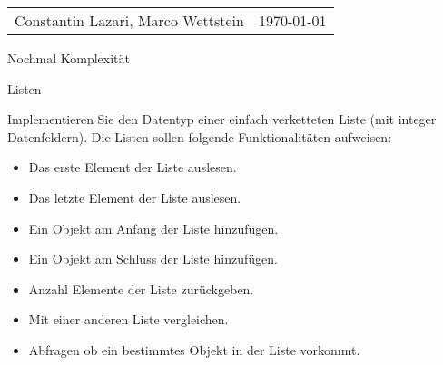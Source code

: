 
\begin{tabularx}{\textwidth}{Xr}
  Constantin Lazari, Marco Wettstein & \today\\
\end{tabularx}

\begin{questions}
  \question
  Nochmal Komplexität

	\question
	Listen
	
	Implementieren Sie den Datentyp einer einfach verketteten Liste (mit integer Datenfeldern). Die Listen sollen folgende Funktionalitäten aufweisen:
	
	\begin{itemize}
	\item  Das erste Element der Liste auslesen.

	\item Das letzte Element der Liste auslesen.

	\item Ein Objekt am Anfang der Liste hinzufügen.

	\item Ein Objekt am Schluss der Liste hinzufügen.

	\item Anzahl Elemente der Liste zurückgeben.
	\item Mit einer anderen Liste vergleichen.
	\item Abfragen ob ein bestimmtes Objekt in der Liste vorkommt.
	\end{itemize}


\end{questions}
